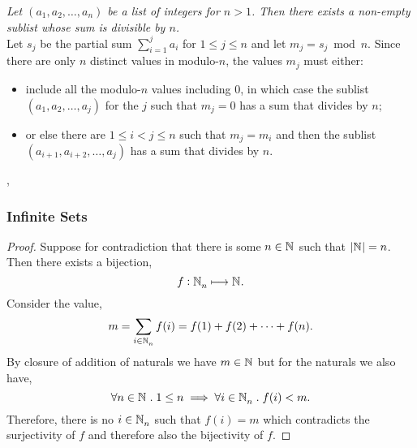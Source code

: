 \documentclass[../MathsNotesBase.tex]{subfiles}
\begin{document}
{\begin{exe}
			\ex \textit{Let ${ (a_1,a_2,\dots, a_n) }$ be a list of integers for ${ n > 1 }$. Then there exists a non-empty sublist whose sum is divisible by $n$.}\\
			
			Let $s_j$ be the partial sum ${ \sum_{i=1}^j a_i }$ for ${ 1 \leq j \leq n }$ and let ${ m_j = s_j \bmod n }$. Since there are only $n$ distinct values in modulo-$n$, the values $m_j$ must either:
			\begin{itemize}
				\item include all the modulo-$n$ values including 0, in which case the sublist ${ (a_1,a_2,\dots, a_j) }$ for the $j$ such that ${ m_j = 0 }$ has a sum that divides by $n$;
				\item or else there are ${ 1 \leq i < j \leq n }$ such that ${ m_j = m_i }$ and then the sublist ${ (a_{i+1},a_{i+2}, \dots, a_j) }$ has a sum that divides by $n$.
			\end{itemize}
			
		\end{exe}
		\sep
	
	

	
		
		\biggerskip
		\subsubsection{Infinite Sets}
		
		
		\bigskip
		\begin{proof}
			Suppose for contradiction that there is some ${ n \in \mathbb{N}^{} }$ such that ${ \left\lvert\mathbb{N}^{}\right\rvert = n }$. Then there exists a bijection,
			\[ f: \mathbb{N}^{}_n \longmapsto \mathbb{N}^{}. \]
			Consider the value,
			\[ m = \sum_{i \in \mathbb{N}^{}_n} f(i) = f(1) + f(2) + \cdots + f(n). \]
			By closure of addition of naturals we have ${ m \in \mathbb{N}^{} }$ but for the naturals we also have,
			\[ \forall n \in \mathbb{N}^{} \;.\; 1 \leq n \implies \forall i \in \mathbb{N}^{}_n \;.\; f(i) < m. \]
			Therefore, there is no ${ i \in \mathbb{N}^{}_n }$ such that ${ f(i) = m }$ which contradicts the surjectivity of $f$ and therefore also the bijectivity of $f$.
		\end{proof}
		
}
\end{document}
